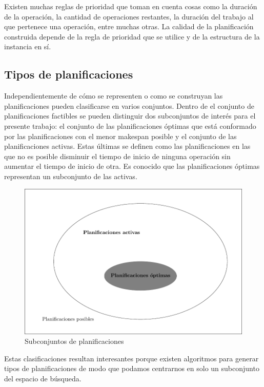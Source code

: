 Existen muchas reglas de prioridad que toman en cuenta cosas como la duración de la operación, la cantidad de operaciones restantes, la duración del trabajo al que pertenece una operación, entre muchas otras. La calidad de la planificación construida depende de la regla de prioridad que se utilice y de la estructura de la instancia en sí.


\subsection{Tipos de planificaciones}
Independientemente de cómo se representen o como se construyan las planificaciones pueden clasificarse en varios conjuntos. Dentro de el conjunto de planificaciones factibles se pueden distinguir dos subconjuntos de interés para el presente trabajo: el conjunto de las planificaciones óptimas que está conformado por las planificaciones con el menor makespan posible y el conjunto de las planificaciones activas. 
Estas últimas se definen como las planificaciones en las que no es posible disminuir el tiempo de inicio de ninguna operación sin aumentar el tiempo de inicio de otra. Es conocido que las planificaciones óptimas representan un subconjunto de las activas\cite{Ponsich2013}.


\begin{figure}[H]
    \centering
    \includegraphics[scale=.8]{Imagenes/solspace.pdf}
    \caption{Subconjuntos de planificaciones}
\end{figure}

Estas clasificaciones resultan interesantes porque existen algoritmos para generar tipos de planificaciones de modo que podamos centrarnos en solo un subconjunto del espacio de búsqueda.
